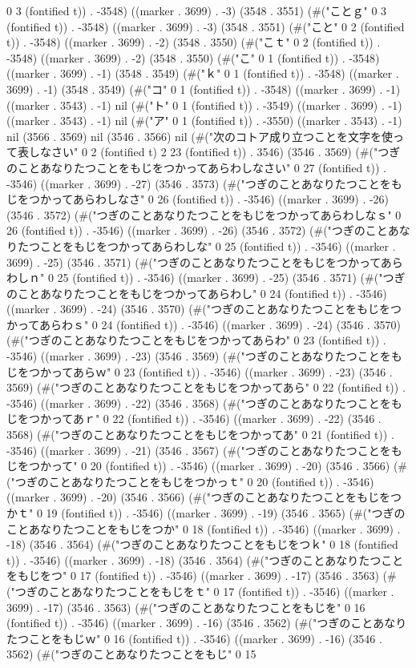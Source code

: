 0 3 (fontified t)) . -3548) ((marker . 3699) . -3) (3548 . 3551) (#("ことｇ" 0 3 (fontified t)) . -3548) ((marker . 3699) . -3) (3548 . 3551) (#("こと" 0 2 (fontified t)) . -3548) ((marker . 3699) . -2) (3548 . 3550) (#("こｔ" 0 2 (fontified t)) . -3548) ((marker . 3699) . -2) (3548 . 3550) (#("こ" 0 1 (fontified t)) . -3548) ((marker . 3699) . -1) (3548 . 3549) (#("ｋ" 0 1 (fontified t)) . -3548) ((marker . 3699) . -1) (3548 . 3549) (#("コ" 0 1 (fontified t)) . -3548) ((marker . 3699) . -1) ((marker . 3543) . -1) nil (#("ト" 0 1 (fontified t)) . -3549) ((marker . 3699) . -1) ((marker . 3543) . -1) nil (#("ア" 0 1 (fontified t)) . -3550) ((marker . 3543) . -1) nil (3566 . 3569) nil (3546 . 3566) nil (#("次のコトア成り立つことを文字を使って表しなさい" 0 2 (fontified t) 2 23 (fontified t)) . 3546) (3546 . 3569) (#("つぎのことあなりたつことをもじをつかってあらわしなさい" 0 27 (fontified t)) . -3546) ((marker . 3699) . -27) (3546 . 3573) (#("つぎのことあなりたつことをもじをつかってあらわしなさ" 0 26 (fontified t)) . -3546) ((marker . 3699) . -26) (3546 . 3572) (#("つぎのことあなりたつことをもじをつかってあらわしなｓ" 0 26 (fontified t)) . -3546) ((marker . 3699) . -26) (3546 . 3572) (#("つぎのことあなりたつことをもじをつかってあらわしな" 0 25 (fontified t)) . -3546) ((marker . 3699) . -25) (3546 . 3571) (#("つぎのことあなりたつことをもじをつかってあらわしｎ" 0 25 (fontified t)) . -3546) ((marker . 3699) . -25) (3546 . 3571) (#("つぎのことあなりたつことをもじをつかってあらわし" 0 24 (fontified t)) . -3546) ((marker . 3699) . -24) (3546 . 3570) (#("つぎのことあなりたつことをもじをつかってあらわｓ" 0 24 (fontified t)) . -3546) ((marker . 3699) . -24) (3546 . 3570) (#("つぎのことあなりたつことをもじをつかってあらわ" 0 23 (fontified t)) . -3546) ((marker . 3699) . -23) (3546 . 3569) (#("つぎのことあなりたつことをもじをつかってあらｗ" 0 23 (fontified t)) . -3546) ((marker . 3699) . -23) (3546 . 3569) (#("つぎのことあなりたつことをもじをつかってあら" 0 22 (fontified t)) . -3546) ((marker . 3699) . -22) (3546 . 3568) (#("つぎのことあなりたつことをもじをつかってあｒ" 0 22 (fontified t)) . -3546) ((marker . 3699) . -22) (3546 . 3568) (#("つぎのことあなりたつことをもじをつかってあ" 0 21 (fontified t)) . -3546) ((marker . 3699) . -21) (3546 . 3567) (#("つぎのことあなりたつことをもじをつかって" 0 20 (fontified t)) . -3546) ((marker . 3699) . -20) (3546 . 3566) (#("つぎのことあなりたつことをもじをつかっｔ" 0 20 (fontified t)) . -3546) ((marker . 3699) . -20) (3546 . 3566) (#("つぎのことあなりたつことをもじをつかｔ" 0 19 (fontified t)) . -3546) ((marker . 3699) . -19) (3546 . 3565) (#("つぎのことあなりたつことをもじをつか" 0 18 (fontified t)) . -3546) ((marker . 3699) . -18) (3546 . 3564) (#("つぎのことあなりたつことをもじをつｋ" 0 18 (fontified t)) . -3546) ((marker . 3699) . -18) (3546 . 3564) (#("つぎのことあなりたつことをもじをつ" 0 17 (fontified t)) . -3546) ((marker . 3699) . -17) (3546 . 3563) (#("つぎのことあなりたつことをもじをｔ" 0 17 (fontified t)) . -3546) ((marker . 3699) . -17) (3546 . 3563) (#("つぎのことあなりたつことをもじを" 0 16 (fontified t)) . -3546) ((marker . 3699) . -16) (3546 . 3562) (#("つぎのことあなりたつことをもじｗ" 0 16 (fontified t)) . -3546) ((marker . 3699) . -16) (3546 . 3562) (#("つぎのことあなりたつことをもじ" 0 15 